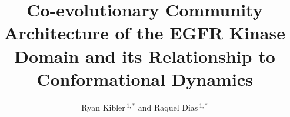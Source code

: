 \documentclass[utf8]{FrontiersinHarvard}
\def\firstAuthorLast{Kibler and Dias} %
\def\Authors{Ryan Kibler\,$^{1,*}$ and Raquel Dias\,$^{1,*}$}
\begin{document}
\onecolumn
{}

\title[Co-evolutionary Communities in the EGFR Kinase Domain]{Co-evolutionary Community Architecture of the EGFR Kinase Domain and its Relationship to Conformational Dynamics}

\author[\firstAuthorLast ]{\Authors}
\address{}
\correspondance{}


\maketitle

\begin{abstract}

\end{abstract}
\end{document}
